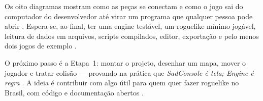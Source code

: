 \documentclass[12pt]{article}
\begin{document}
Os oito diagramas mostram como as peças se conectam e como o jogo sai do computador do
desenvolvedor até virar um programa que qualquer pessoa pode abrir \citep{wix2024,
netpublish2024}. Espera-se, ao final, ter uma engine testável, um roguelike mínimo jogável,
leitura de dados em arquivos, scripts compilados, editor, exportação e pelo menos dois jogos de
exemplo \citep{craddock2015,pinheiro2020,hendrikx2013,xunit2024,martin2017}.

O próximo passo é a Etapa~1: montar o projeto, desenhar um mapa, mover o jogador e tratar
colisão --- provando na prática que \textit{SadConsole é tela; Engine é regra}
\citep{beck2001,boehm1988,roguecelebration2022,sadconsole2024}. A ideia é contribuir com algo
útil para quem quer fazer roguelike no Brasil, com código e documentação abertos
\citep{pinheiro2020,hendrikx2011}.



\end{document}
